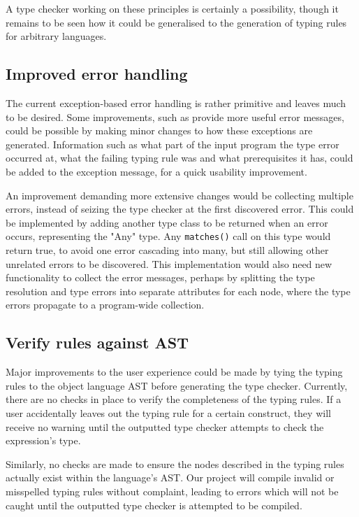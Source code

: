 \documentclass[nofilelist]{cslthse-msc}
\begin{document}

A type checker working on these principles is certainly a possibility, though it remains to be seen how it could be generalised to the generation of typing rules for arbitrary languages.

\subsection{Improved error handling}
The current exception-based error handling is rather primitive and leaves much to be desired.
Some improvements, such as provide more useful error messages, could be possible by making minor changes to how these exceptions are generated.
Information such as what part of the input program the type error occurred at, what the failing typing rule was and what prerequisites it has, could be added to the exception message, for a quick usability improvement.

An improvement demanding more extensive changes would be collecting multiple errors, instead of seizing the type checker at the first discovered error.
This could be implemented by adding another type class to be returned when an error occurs, representing the "Any" type.
Any \verb|matches()| call on this type would return true, to avoid one error cascading into many, but still allowing other unrelated errors to be discovered.
This implementation would also need new functionality to collect the error messages, perhaps by splitting the type resolution and type errors into separate attributes for each node, where the type errors propagate to a program-wide collection.


\subsection{Verify rules against AST}
Major improvements to the user experience could be made by tying the typing rules to the object language AST before generating the type checker.
Currently, there are no checks in place to verify the completeness of the typing rules.
If a user accidentally leaves out the typing rule for a certain construct, they will receive no warning until the outputted type checker attempts to check the expression's type.

Similarly, no checks are made to ensure the nodes described in the typing rules actually exist within the language's AST.
Our project will compile invalid or misspelled typing rules without complaint, leading to errors which will not be caught until the outputted type checker is attempted to be compiled.
\end{document}
